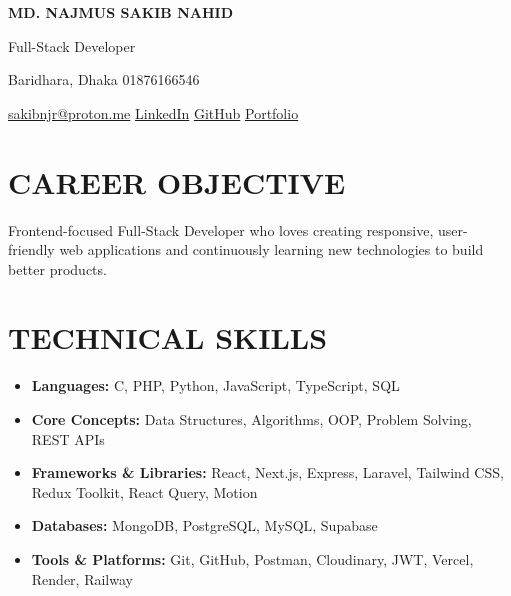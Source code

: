 \documentclass[10pt,a4paper]{article}
\begin{document}

\begin{center}
{\Huge\bfseries MD. NAJMUS SAKIB NAHID}

\vspace{2mm}

{\large Full-Stack Developer}

\vspace{1mm}

Baridhara, Dhaka \hspace{0.3em}\textbar\hspace{0.3em} 01876166546

\vspace{0.8mm}

\href{mailto:sakibnjr@proton.me}{sakibnjr@proton.me}
\hspace{0.3em}\textbar\hspace{0.3em}
\href{https://www.linkedin.com/in/sakibnjr/}{LinkedIn}
\hspace{0.3em}\textbar\hspace{0.3em}
\href{https://github.com/sakibnjr}{GitHub}
\hspace{0.3em}\textbar\hspace{0.3em}
\href{https://sakibnjr-portfolio.vercel.app/}{Portfolio}
\end{center}


\section*{CAREER OBJECTIVE}

Frontend-focused Full-Stack Developer who loves creating responsive, user-friendly web applications and continuously learning new technologies to build better products.


\section*{TECHNICAL SKILLS}

\begin{itemize}
    \item \textbf{Languages:} C, PHP, Python, JavaScript, TypeScript, SQL
    \item \textbf{Core Concepts:} Data Structures, Algorithms, OOP, Problem Solving, REST APIs
    \item \textbf{Frameworks \& Libraries:} React, Next.js, Express, Laravel, Tailwind CSS, Redux Toolkit, React Query, Motion
    \item \textbf{Databases:} MongoDB, PostgreSQL, MySQL, Supabase
    \item \textbf{Tools \& Platforms:} Git, GitHub, Postman, Cloudinary, JWT, Vercel, Render, Railway
\end{itemize}
\end{document}
